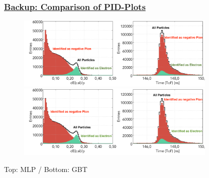 \documentclass[xcolor=table, xcolor=dvipsnames]{beamer}
\begin{document}
\begin{frame}
  \frametitle{\hyperlink{bup}{Backup: Comparison of PID-Plots}}
  \label{compPid}
  \footnotesize
  
  \begin{figure}
    \includegraphics[width=0.85\textwidth]{pidCALTMLP_HL85V123456N6000R1.png}\\
   \includegraphics[width=0.85\textwidth]{pidCALT_GBTV123456R1.png}
  \end{figure}
  Top: MLP / Bottom: GBT
  
\end{frame}
\end{document}
